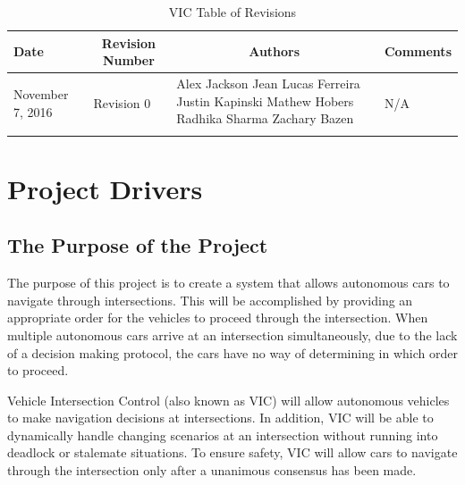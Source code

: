 \documentclass [12pt]{article}
\begin{document}
\thispagestyle{empty}
\begin{longtable}{| p{ } | p{ } | p{ } | p{ } |}

\hline 
\centering \textbf{Date} & 
\multicolumn{1}{c}{\textbf {Revision Number}} &
\multicolumn{1}{|c}{\textbf {Authors}} & 
\multicolumn{1}{|c|}{\textbf {Comments}} \\ \hline

\multirow{4}{*}{\centering November 7, 2016}  & 
\multirow{4}{*}{Revision 0}& 
{Alex Jackson \newline
Jean Lucas Ferreira \newline
Justin Kapinski\newline
Mathew Hobers\newline
Radhika Sharma\newline
Zachary Bazen}
&
 \multirow{4}{*}{N/A} \\ 
\hline 

\caption{VIC Table of Revisions} 
\end{longtable}
\pagebreak



\section {\textbf{Project Drivers}}


\subsection{The Purpose of the Project} 
The purpose of this project is to create a system that allows autonomous cars to navigate through  intersections. This will be accomplished by providing an appropriate order for the vehicles to proceed through the intersection. When multiple autonomous cars arrive at an intersection simultaneously, due to the lack of a decision making protocol, the cars have no way of determining in which order to proceed. \newline


Vehicle Intersection Control (also known as VIC) will allow autonomous vehicles to make navigation decisions at intersections. In addition, VIC will be able to dynamically handle changing scenarios at an intersection without running into deadlock or stalemate situations. To ensure safety, VIC will allow cars to navigate through the intersection only after a unanimous consensus has been made. \newline
\end{document}
